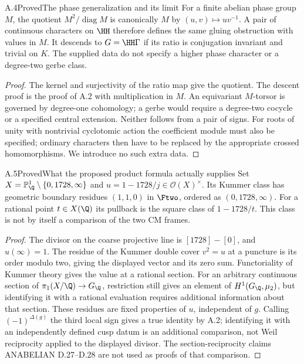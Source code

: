 \begin{statement}{A.4}{Proved}{The phase generalization and its limit}
For a finite abelian phase group $M$, the quotient
$M^2/\operatorname{diag}M$ is canonically $M$ by
$(u,v)\mapsto uv^{-1}$. A pair of continuous characters on $\HH$
therefore defines the same gluing obstruction with values in $M$.
It descends to $G=\HH\Gamma$ if its ratio is conjugation invariant
and trivial on $K$. The supplied data do not specify a higher phase
character or a degree-two gerbe class.
\end{statement}
\begin{proof}
The kernel and surjectivity of the ratio map give the quotient.
The descent proof is the proof of A.2 with multiplication in $M$.
An equivariant $M$-torsor is governed by degree-one cohomology;
a gerbe would require a degree-two cocycle or a specified central
extension. Neither follows from a pair of signs. For roots of unity
with nontrivial cyclotomic action the coefficient module must also
be specified; ordinary characters then have to be replaced by the
appropriate crossed homomorphisms. We introduce no such extra data.
\end{proof}

\begin{statement}{A.5}{Proved}{What the proposed product formula actually supplies}
Set $X=\mathbb P^1_{\Q}\setminus\{0,1728,\infty\}$ and
$u=1-1728/j\in\mathcal O(X)^\times$. Its Kummer class has geometric
boundary residues $(1,1,0)$ in $\Ftwo$, ordered as
$(0,1728,\infty)$. For a rational point $t\in X(\Q)$ its pullback
is the square class of $1-1728/t$. This class is not by itself a
comparison of the two CM frames.
\end{statement}
\begin{proof}
The divisor on the coarse projective line is
$[1728]-[0]$, and $u(\infty)=1$. The residue of the Kummer double
cover $v^2=u$ at a puncture is its order modulo two, giving the
displayed vector and its zero sum. Functoriality of Kummer theory
gives the value at a rational section. For an arbitrary continuous
section of $\pi_1(X/\Q)\to G_{\Q}$, restriction still gives an
element of $H^1(G_{\Q},\mu_2)$, but identifying it with a rational
evaluation requires additional information about that section.
These residues are fixed properties of $u$, independent of $g$.
Calling $(-1)^{\Delta(g)}$ the third local sign gives a true
identity by A.2; identifying it with an independently defined
cusp datum is an additional comparison, not Weil reciprocity
applied to the displayed divisor. The section-reciprocity claims
ANABELIAN D.27--D.28 are not used as proofs of that comparison.
\end{proof}

